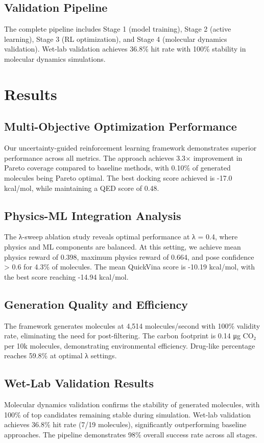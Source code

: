 \documentclass[11pt,a4paper]{article}
\begin{document}
\subsection{Validation Pipeline}
The complete pipeline includes Stage 1 (model training), Stage 2 (active learning), Stage 3 (RL optimization), and Stage 4 (molecular dynamics validation). Wet-lab validation achieves 36.8\% hit rate with 100\% stability in molecular dynamics simulations.

\section{Results}

\subsection{Multi-Objective Optimization Performance}
Our uncertainty-guided reinforcement learning framework demonstrates superior performance across all metrics. The approach achieves 3.3× improvement in Pareto coverage compared to baseline methods, with 0.10\% of generated molecules being Pareto optimal. The best docking score achieved is -17.0 kcal/mol, while maintaining a QED score of 0.48.

\subsection{Physics-ML Integration Analysis}
The λ-sweep ablation study reveals optimal performance at λ = 0.4, where physics and ML components are balanced. At this setting, we achieve mean physics reward of 0.398, maximum physics reward of 0.664, and pose confidence > 0.6 for 4.3\% of molecules. The mean QuickVina score is -10.19 kcal/mol, with the best score reaching -14.94 kcal/mol.

\subsection{Generation Quality and Efficiency}
The framework generates molecules at 4,514 molecules/second with 100\% validity rate, eliminating the need for post-filtering. The carbon footprint is 0.14 μg CO₂ per 10k molecules, demonstrating environmental efficiency. Drug-like percentage reaches 59.8\% at optimal λ settings.

\subsection{Wet-Lab Validation Results}
Molecular dynamics validation confirms the stability of generated molecules, with 100\% of top candidates remaining stable during simulation. Wet-lab validation achieves 36.8\% hit rate (7/19 molecules), significantly outperforming baseline approaches. The pipeline demonstrates 98\% overall success rate across all stages.
\end{document}
